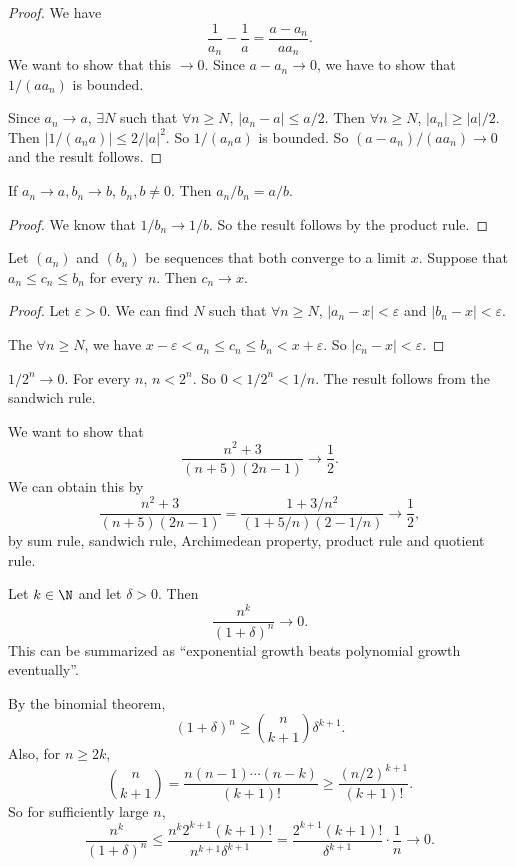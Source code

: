 \documentclass[a4paper]{article}
\begin{document}
\begin{proof}
  We have
  \[
    \frac{1}{a_n} - \frac{1}{a} = \frac{a - a_n}{aa_n}.
  \]
  We want to show that this $\to 0$. Since $a - a_n \to 0$, we have to show that $1/(aa_n)$ is bounded.

  Since $a_n \to a$, $\exists N$ such that $\forall n\geq N$, $|a_n - a| \leq a/2$. Then $\forall n\geq N$, $|a_n| \geq |a|/2$. Then $|1/(a_na)| \leq 2/|a|^2$. So $1/(a_na)$ is bounded. So $(a - a_n)/(aa_n)\to 0$ and the result follows.
\end{proof}

\begin{cor}
  If $a_n \to a, b_n \to b$, $b_n, b\not= 0$. Then $a_n/b_n = a/b$.
\end{cor}

\begin{proof}
  We know that $1/b_n \to 1/b$. So the result follows by the product rule.
\end{proof}

\begin{lemma}
  Let $(a_n)$ and $(b_n)$ be sequences that both converge to a limit $x$. Suppose that $a_n \leq c_n \leq b_n$ for every $n$. Then $c_n \to x$.
\end{lemma}

\begin{proof}
  Let $\varepsilon > 0$. We can find $N$ such that $\forall n \geq N$, $|a_n - x| < \varepsilon$ and $|b_n - x| < \varepsilon$.

  The $\forall n\geq N$, we have $x - \varepsilon < a_n \leq c_n \leq b_n < x + \varepsilon$. So $|c_n - x| < \varepsilon$.
\end{proof}

\begin{eg}
  $1/2^n \to 0$. For every $n$, $n < 2^n$. So $0 < 1/2^n < 1/n$. The result follows from the sandwich rule.
\end{eg}
\begin{eg}
  We want to show that
  \[
    \frac{n^2 + 3}{(n + 5)(2n - 1)} \to \frac{1}{2}.
  \]
  We can obtain this by
  \[
    \frac{n^2 + 3}{(n + 5)(2n - 1)} = \frac{1 + 3/n^2}{(1 + 5/n)(2 - 1/n)} \to \frac{1}{2},
  \]
  by sum rule, sandwich rule, Archimedean property, product rule and quotient rule.
\end{eg}

\begin{eg}
  Let $k\in \N$ and let $\delta > 0$. Then
  \[
    \frac{n^k}{(1 + \delta)^n}\to 0.
  \]
  This can be summarized as ``exponential growth beats polynomial growth eventually''.

  By the binomial theorem,
  \[
    (1 + \delta)^n \geq \binom{n}{k + 1}\delta^{k + 1}.
  \]
  Also, for $n\geq 2k$,
  \[
    \binom{n}{k + 1} = \frac{n(n - 1)\cdots(n - k)}{(k + 1)!} \geq \frac{(n/2)^{k + 1}}{(k + 1)!}.
  \]
  So for sufficiently large $n$,
  \[
    \frac{n^k}{(1 + \delta)^n} \leq \frac{n^k 2^{k + 1} (k+1)!}{n^{k + 1}\delta^{k + 1}} = \frac{2^{k + 1} (k + 1)!}{\delta^{k + 1}} \cdot \frac{1}{n} \to 0.
  \]
\end{eg}
\end{document}
